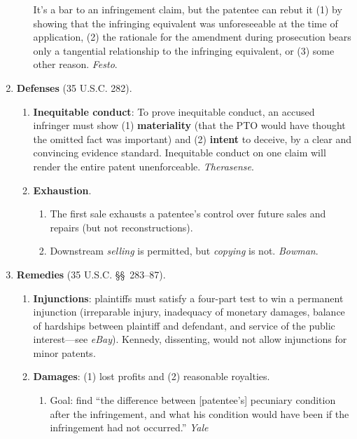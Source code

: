 \begin{enumerate}
\begin{enumerate}
        It's a bar to an infringement claim, but the patentee can rebut it (1) 
        by showing that the infringing equivalent was unforeseeable at the 
        time of application, (2) the rationale for the amendment during 
        prosecution bears only a tangential relationship to the infringing 
        equivalent, or (3) some other reason. \emph{Festo}.
    \end{enumerate}
    \item \textbf{Defenses} (35 U.S.C. 282).
    \begin{enumerate}
        \item \textbf{Inequitable conduct}: To prove inequitable conduct, an 
        accused infringer must show (1) \textbf{materiality} (that the PTO 
        would have thought the omitted fact was important) and (2) 
        \textbf{intent} to deceive, by a clear and convincing evidence 
        standard. Inequitable conduct on one claim will render the entire 
        patent unenforceable. \emph{Therasense}.
        \item \textbf{Exhaustion}.
        \begin{enumerate}
            \item The first sale exhausts a patentee's control over future 
            sales and repairs (but not reconstructions).
            \item Downstream \emph{selling} is permitted, but \emph{copying} 
            is not. \emph{Bowman}.
        \end{enumerate}
    \end{enumerate}
    \item \textbf{Remedies} (35 U.S.C. \S\S\ 283--87).
    \begin{enumerate}
        \item \textbf{Injunctions}: plaintiffs must satisfy a four-part test 
        to win a permanent injunction (irreparable injury, inadequacy of 
        monetary damages, balance of hardships between plaintiff and 
        defendant, and service of the public interest---see \emph{eBay}). 
        Kennedy, dissenting, would not allow injunctions for minor patents.
        \item \textbf{Damages}: (1) lost profits and (2) reasonable royalties.
        \begin{enumerate}
            \item Goal: find ``the difference between [patentee's] pecuniary 
            condition after the infringement, and what his condition would 
            have been if the infringement had not occurred.'' \emph{Yale 
}
\end{enumerate}
\end{enumerate}
\end{enumerate}
